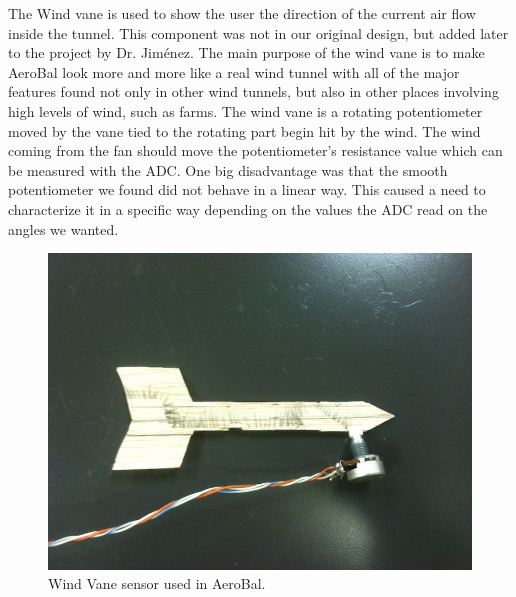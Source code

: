 		The Wind vane is used to show the user the direction of the current air flow inside the tunnel. This component was not in our original design, but added later to the project by Dr. Jim\'{e}nez. The main purpose of the wind vane is to make AeroBal look more and more like a real wind tunnel with all of the major features found not only in other wind tunnels, but also in other places involving high levels of wind, such as farms.
		The wind vane is a rotating potentiometer moved by the vane tied to the rotating part begin hit by the wind. The wind coming from the fan should move the potentiometer's resistance value which can be measured with the ADC.
		One big disadvantage was that the smooth potentiometer we found did not behave in a linear way. This caused a need to characterize it in a specific way depending on the values the ADC read on the angles we wanted. 
		\begin{figure}[H]
			\centering
				\includegraphics[scale=0.35]{img/windVane}
			\caption{Wind Vane sensor used in AeroBal.}
		\end{figure}
		
